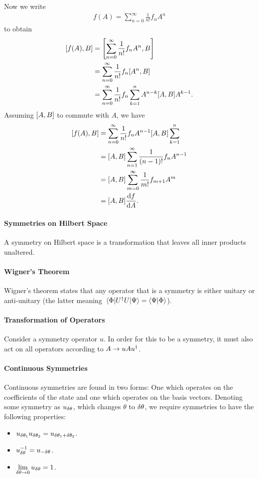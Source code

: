 Now we write
\begin{align*}
	f(A) = \sum\limits_{n = 0}^{\infty}\frac{1}{n!}f_{n}A^{n}
\end{align*}
to obtain
\begin{align*}
	\comm{f(A)}{B} &= \comm{\sum\limits_{n = 0}^{\infty}\frac{1}{n!}f_{n}A^{n}}{B} \\
	               &= \sum\limits_{n = 0}^{\infty}\frac{1}{n!}f_{n}\comm{A^{n}}{B} \\
	               &= \sum\limits_{n = 0}^{\infty}\frac{1}{n!}f_{n}\sum\limits_{k = 1}^{n}A^{n - k}\comm{A}{B}A^{k - 1}.
\end{align*}
Assuming $\comm{A}{B}$ to commute with $A$, we have
\begin{align*}
	\comm{f(A)}{B} &= \sum\limits_{n = 0}^{\infty}\frac{1}{n!}f_{n}A^{n - 1}\comm{A}{B}\sum\limits_{k = 1}^{n} \\
	               &= \comm{A}{B}\sum\limits_{n = 1}^{\infty}\frac{1}{(n - 1)!}f_{n}A^{n - 1} \\
	               &= \comm{A}{B}\sum\limits_{m = 0}^{\infty}\frac{1}{m!}f_{m + 1}A^{m} \\
	               &= \comm{A}{B}\dv{f}{A}.
\end{align*}

\paragraph{Symmetries on Hilbert Space}
A symmetry on Hilbert space is a transformation that leaves all inner products unaltered.

\paragraph{Wigner's Theorem}
Wigner's theorem states that any operator that is a symmetry is either unitary or anti-unitary (the latter meaning $\mel{\Phi}{U^{\dagger}U}{\Psi} = \braket{\Psi}{\Phi}$).

\paragraph{Transformation of Operators}
Consider a symmetry operator $u$. In order for this to be a symmetry, it must also act on all operators according to $A\to uAu^{\dagger}$.

\paragraph{Continuous Symmetries}
Continuous symmetries are found in two forms: One which operates on the coefficients of the state and one which operates on the basis vectors. Denoting some symmetry as $u_{\var{\theta}}$, which changes $\theta$ to $\var{\theta}$, we require symmetries to have the following properties:
\begin{itemize}
	\item $u_{\var{\theta_{1}}}u_{\var{\theta_{2}}} = u_{\var{\theta_{1}} + \var{\theta_{2}}}$.
	\item $u_{\var{\theta}}^{-1} = u_{-\var{\theta}}$.
	\item $\lim\limits_{\var{\theta} \to 0}u_{\var{\theta}} = 1$.
\end{itemize}


